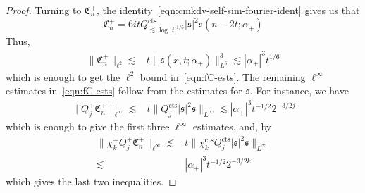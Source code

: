\documentclass[10pt,a4paper]{amsart}
\newcommand{\fC}{\mathfrak{C}}
\newcommand{\fs}{\mathfrak{s}}
\newcommand{\tcts}{\text{cts}}
\begin{document}
\begin{proof}
    Turning to $\fC_n^+$, the identity~\eqref{eqn:cmkdv-self-sim-fourier-ident} gives us that
    \begin{equation*}
        \fC_n^+ = 6it Q_{\lesssim \log |t|^{1/5}}^\tcts |\fs|^2\fs(n - 2t;\alpha_+)
    \end{equation*}
    Thus,
    \begin{equation*}\begin{split}
        \lVert \fC_n^+ \rVert_{\ell^2} \lesssim& t \lVert \fs(x,t;\alpha_+) \rVert_{L^6}^3
        \lesssim |\alpha_+|^3 t^{1/6}
    \end{split}
    \end{equation*}
    which is enough to get the $\ell^2$ bound in~\eqref{eqn:fC-ests}.  The remaining $\ell^\infty$ estimates in~\eqref{eqn:fC-ests} follow from the estimates for $\fs$. For instance, we have
    \begin{equation*}\begin{split}
        \lVert Q_j^+ \fC^+_n \rVert_{\ell^\infty} \lesssim& t\lVert Q_j^\tcts |\fs|^2\fs \rVert_{L^\infty}
        \lesssim |\alpha_{+}|^3 t^{-1/2} 2^{-3/2j}
    \end{split}\end{equation*}
    which is enough to give the first three $\ell^\infty$ estimates, and, by~
    \begin{equation*}\begin{split}
        \lVert \chi_{k}^+ Q_j^+ \fC^+_n \rVert_{\ell^\infty} \lesssim& t\lVert \chi_k^\tcts Q_j^\tcts |\fs|^2\fs \rVert_{L^\infty}\\
        \lesssim& |\alpha_{+}|^3 t^{-1/2} 2^{-3/2k}
    \end{split}\end{equation*}
    which gives the last two inequalities.
\end{proof}
\end{document}
